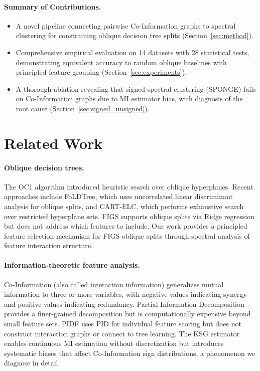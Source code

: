 \documentclass[11pt,letterpaper]{article}
\begin{document}
\paragraph{Summary of Contributions.}
\begin{itemize}
  \item A novel pipeline connecting pairwise Co-Information graphs to spectral clustering for constraining oblique decision tree splits (Section~\ref{sec:method}).
  \item Comprehensive empirical evaluation on 14 datasets with 28 statistical tests, demonstrating equivalent accuracy to random oblique baselines with principled feature grouping (Section~\ref{sec:experiments}).
  \item A thorough ablation revealing that signed spectral clustering (SPONGE) fails on Co-Information graphs due to MI estimator bias, with diagnosis of the root cause (Section~\ref{sec:signed_unsigned}).
\end{itemize}

\section{Related Work}
\label{sec:related}

\paragraph{Oblique decision trees.} The OC1 algorithm \citep{Murthy1994} introduced heuristic search over oblique hyperplanes. Recent approaches include FoLDTree, which uses uncorrelated linear discriminant analysis for oblique splits, and CART-ELC, which performs exhaustive search over restricted hyperplane sets. FIGS \citep{Tan2025} supports oblique splits via Ridge regression but does not address which features to include. Our work provides a principled feature selection mechanism for FIGS oblique splits through spectral analysis of feature interaction structure.

\paragraph{Information-theoretic feature analysis.} Co-Information \citep{McGill1954, Bell2003} (also called interaction information) generalizes mutual information to three or more variables, with negative values indicating synergy and positive values indicating redundancy. Partial Information Decomposition \citep{Williams2010} provides a finer-grained decomposition but is computationally expensive beyond small feature sets. PIDF \citep{Westphal2025} uses PID for individual feature scoring but does not construct interaction graphs or connect to tree learning. The KSG estimator \citep{Kraskov2004} enables continuous MI estimation without discretization but introduces systematic biases that affect Co-Information sign distributions, a phenomenon we diagnose in detail.
\end{document}
